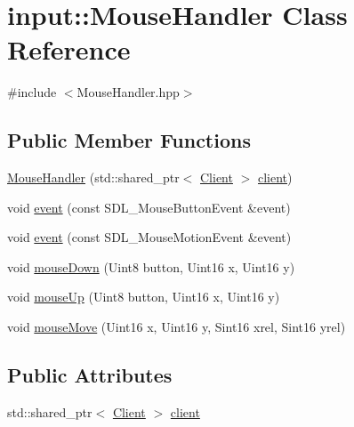 \hypertarget{classinput_1_1MouseHandler}{\section{input\-:\-:Mouse\-Handler Class Reference}
\label{classinput_1_1MouseHandler}
}


{\ttfamily \#include $<$Mouse\-Handler.\-hpp$>$}

\subsection*{Public Member Functions}
\begin{DoxyCompactItemize}
\item 
\hyperlink{classinput_1_1MouseHandler_a6a0284a9a79639e660c4d9035f386dde}{Mouse\-Handler} (std\-::shared\-\_\-ptr$<$ \hyperlink{classClient}{Client} $>$ \hyperlink{classinput_1_1MouseHandler_ac37001963ba5021f385b7d8e2da91f74}{client})
\item 
void \hyperlink{classinput_1_1MouseHandler_a514e7d30f35f46b0c91e8dd7d48eef11}{event} (const S\-D\-L\-\_\-\-Mouse\-Button\-Event \&event)
\item 
void \hyperlink{classinput_1_1MouseHandler_a9167b1c227ccda43546261eb5550c037}{event} (const S\-D\-L\-\_\-\-Mouse\-Motion\-Event \&event)
\item 
void \hyperlink{classinput_1_1MouseHandler_ab8cfabc0f3ff4c5384fe7ccab36fbd4f}{mouse\-Down} (Uint8 button, Uint16 x, Uint16 y)
\item 
void \hyperlink{classinput_1_1MouseHandler_a6bc9a771df6b4df479008174792e516d}{mouse\-Up} (Uint8 button, Uint16 x, Uint16 y)
\item 
void \hyperlink{classinput_1_1MouseHandler_a81d05022524309431603f981927521b8}{mouse\-Move} (Uint16 x, Uint16 y, Sint16 xrel, Sint16 yrel)
\end{DoxyCompactItemize}
\subsection*{Public Attributes}
\begin{DoxyCompactItemize}
\item 
std\-::shared\-\_\-ptr$<$ \hyperlink{classClient}{Client} $>$ \hyperlink{classinput_1_1MouseHandler_ac37001963ba5021f385b7d8e2da91f74}{client}
\end{DoxyCompactItemize}


